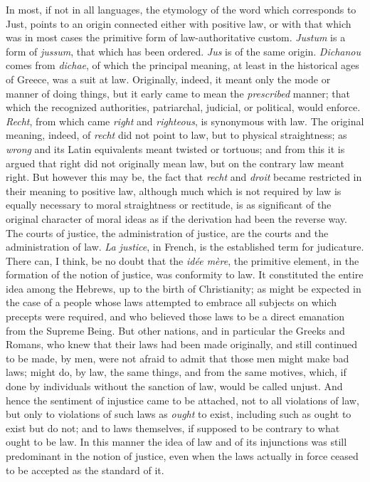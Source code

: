 \documentclass[12pt]{report}
\begin{document}
In most, if not in all languages, the etymology of the word which corresponds to Just, points to an origin connected either with positive law, or with that which was in most cases the primitive form of law-authoritative custom. \emph{Justum} is a form of \emph{jussum}, that which has been ordered. \emph{Jus} is of the same origin. \emph{Dichanou} comes from \emph{dichae}, of which the principal meaning, at least in the historical ages of Greece, was a suit at law. Originally, indeed, it meant only the mode or manner of doing things, but it early came to mean the \emph{prescribed} manner; that which the recognized authorities, patriarchal, judicial, or political, would enforce. \emph{Recht}, from which came \emph{right} and \emph{righteous}, is synonymous with law. The original meaning, indeed, of \emph{recht} did not point to law, but to physical straightness; as \emph{wrong} and its Latin equivalents meant twisted or tortuous; and from this it is argued that right did not originally mean law, but on the contrary law meant right. But however this may be, the fact that \emph{recht} and \emph{droit} became restricted in their meaning to positive law, although much which is not required by law is equally necessary to moral straightness or rectitude, is as significant of the original character of moral ideas as if the derivation had been the reverse way. The courts of justice, the administration of justice, are the courts and the administration of law. \emph{La justice}, in French, is the established term for judicature. There can, I think, be no doubt that the \emph{idée mère}, the primitive element, in the formation of the notion of justice, was conformity to law. It constituted the entire idea among the Hebrews, up to the birth of Christianity; as might be expected in the case of a people whose laws attempted to embrace all subjects on which precepts were required, and who believed those laws to be a direct emanation from the Supreme Being. But other nations, and in particular the Greeks and Romans, who knew that their laws had been made originally, and still continued to be made, by men, were not afraid to admit that those men might make bad laws; might do, by law, the same things, and from the same motives, which, if done by individuals without the sanction of law, would be called unjust. And hence the sentiment of injustice came to be attached, not to all violations of law, but only to violations of such laws as \emph{ought} to exist, including such as ought to exist but do not; and to laws themselves, if supposed to be contrary to what ought to be law. In this manner the idea of law and of its injunctions was still predominant in the notion of justice, even when the laws actually in force ceased to be accepted as the standard of it.
\end{document}
